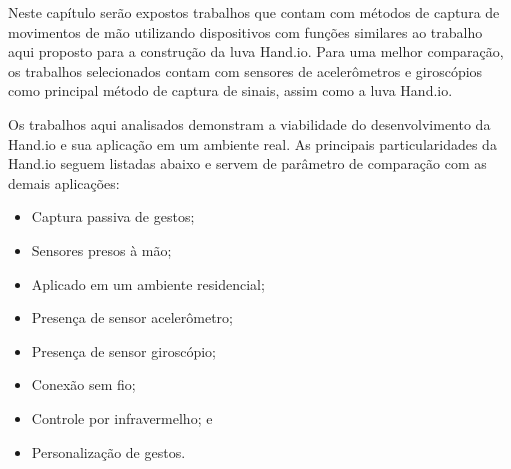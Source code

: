 \label{chapter:correlatos}
Neste capítulo serão expostos trabalhos que contam com métodos de captura de movimentos de mão utilizando dispositivos com funções similares ao trabalho aqui proposto para a construção da luva Hand.io. Para uma melhor comparação, os trabalhos selecionados contam com sensores de acelerômetros e giroscópios como principal método de captura de sinais, assim como a luva Hand.io. 


Os trabalhos aqui analisados demonstram a viabilidade do desenvolvimento da Hand.io e sua aplicação em um ambiente real. As principais particularidades da Hand.io seguem listadas abaixo e servem de parâmetro de comparação com as demais aplicações:
\begin{itemize}
    \item Captura passiva de gestos;
    \item Sensores presos à mão;
    \item Aplicado em um ambiente residencial;
    \item Presença de sensor acelerômetro;
    \item Presença de sensor giroscópio;
    \item Conexão sem fio;
    \item Controle por infravermelho; e
    \item Personalização de gestos.
\end{itemize}


